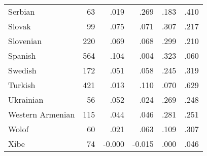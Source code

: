 \begin{longtable}{lrrrrr}
    Serbian & 63 & .019 & .269 & .183 & .410 \\
    Slovak & 99 & .075 & .071 & .307 & .217 \\
    Slovenian & 220 & .069 & .068 & .299 & .210 \\
    Spanish & 564 & .104 & .004 & .323 & .060 \\
    Swedish & 172 & .051 & .058 & .245 & .319 \\
    Turkish & 421 & .013 & .110 & .070 & .629 \\
    Ukrainian & 56 & .052 & .024 & .269 & .248 \\
    Western Armenian & 115 & .044 & .046 & .281 & .251 \\
    Wolof & 60 & .021 & .063 & .109 & .307 \\
    Xibe & 74 & -0.000 & -0.015 & .000 & .046 \\
\end{longtable}


